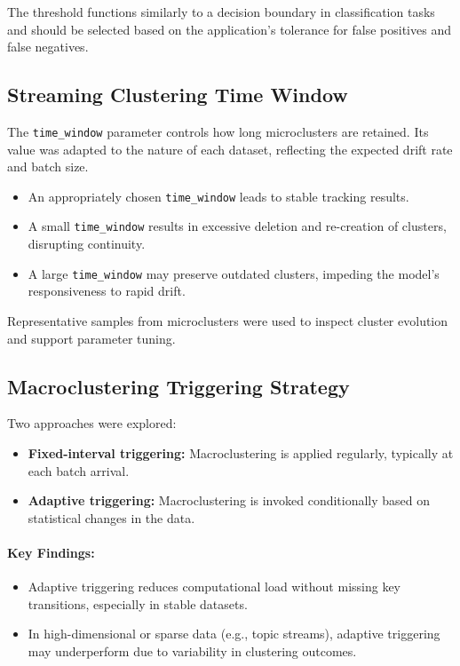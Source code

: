 The threshold functions similarly to a decision boundary in classification
tasks and should be selected based on the application’s tolerance for false
positives and false negatives.

\subsection{Streaming Clustering Time Window}

The \texttt{time\_window} parameter controls how long microclusters are
retained. Its value was adapted to the nature of each dataset, reflecting the
expected drift rate and batch size.

\begin{itemize}
    \item An appropriately chosen \texttt{time\_window} leads to stable tracking results.
    \item A small \texttt{time\_window} results in excessive deletion and re-creation of
          clusters, disrupting continuity.
    \item A large \texttt{time\_window} may preserve outdated clusters, impeding the
          model’s responsiveness to rapid drift.
\end{itemize}

Representative samples from microclusters were used to inspect cluster
evolution and support parameter tuning.

\subsection{Macroclustering Triggering Strategy}

Two approaches were explored:

\begin{itemize}
    \item \textbf{Fixed-interval triggering:} Macroclustering is applied regularly,
          typically at each batch arrival.
    \item \textbf{Adaptive triggering:} Macroclustering is invoked conditionally
          based on statistical changes in the data.
\end{itemize}

\paragraph{Key Findings:}
\begin{itemize}
    \item Adaptive triggering reduces computational load without missing key transitions,
          especially in stable datasets.
    \item In high-dimensional or sparse data (e.g., topic streams), adaptive triggering
          may underperform due to variability in clustering outcomes.
\end{itemize}

